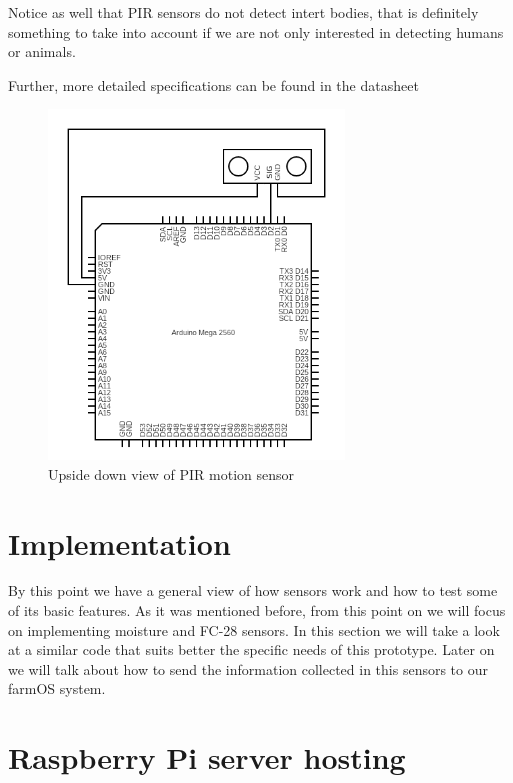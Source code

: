 	Notice as well that PIR sensors do not detect intert bodies, that is definitely something to take into account if we are not only interested in detecting humans or animals.

Further, more detailed specifications can be found in the datasheet\cite{ultrasonic-datasheet}
		
\begin{figure}[H]
    \centering
    \includegraphics[width=0.7\textwidth]{fig/ultrasonic-scheme-circuit.png}
    \caption{Upside down view of PIR motion sensor}
    \label{fig:ultrasonic-scheme-circuit}
\end{figure}




\section{Implementation}
By this point we have a general view of how sensors work and how to test some of its basic features. As it was mentioned before, from this point on we will focus on implementing moisture and FC-28 sensors. In this section we will take a look at a similar code that suits better the specific needs of this prototype. Later on we will talk about how to send the information collected in this sensors to our farmOS system.

\section{Raspberry Pi server hosting}

